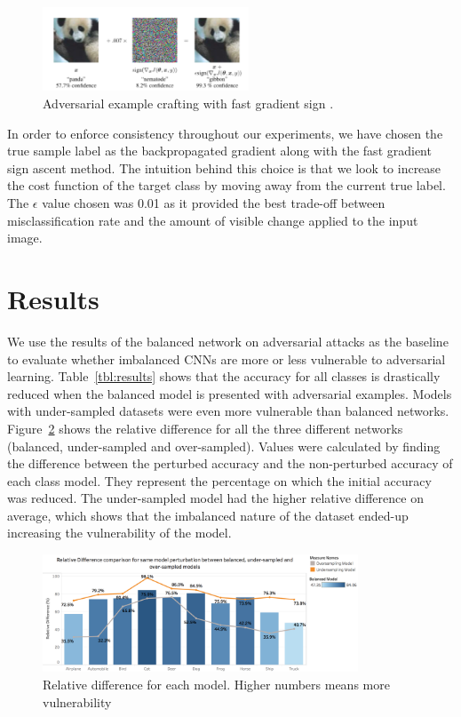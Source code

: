 \documentclass[runningheads,a4paper]{llncs}
\begin{document}
\begin{figure}
	\centering
	\includegraphics[height=2.5cm]{panda.png}
	\caption{Adversarial example crafting with fast gradient sign \cite{goodfellow2014}.}
	\label{fig:fgsm_craft}
\end{figure}

In order to enforce consistency throughout our experiments, we have chosen the true sample label as the backpropagated gradient along with the fast gradient sign ascent method. The intuition behind this choice is that we look to increase the cost function of the target class by moving away from the current true label. The $\epsilon$ value chosen was 0.01 as it provided the best trade-off between misclassification rate and the amount of visible change applied to the input image.


\section{Results}
We use the results of the balanced network on adversarial attacks as the baseline to evaluate whether imbalanced CNNs are more or less vulnerable to adversarial learning. Table~\ref{tbl:results} shows that the accuracy for all classes is drastically reduced when the balanced model is presented with adversarial examples. Models with under-sampled datasets were even more vulnerable than balanced networks. Figure~\ref{fig:relative_difference} shows the relative difference for all the three different networks (balanced, under-sampled and over-sampled). Values were calculated by finding the difference between the perturbed accuracy and the non-perturbed accuracy of each class model. They represent the percentage on which the initial accuracy was reduced. The under-sampled model had the higher relative difference on average, which shows that the imbalanced nature of the dataset ended-up increasing the vulnerability of the model.

\begin{figure}
	\centering
	\includegraphics[height=3.5cm]{rel_diff_graph.png}
	\caption{Relative difference for each model. Higher numbers means more vulnerability}
	\label{fig:relative_difference}
\end{figure}
\end{document}
